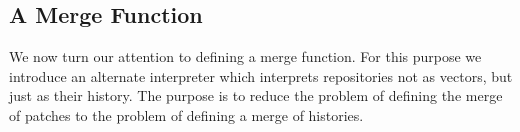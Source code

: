 \subsection{A Merge Function}

We now turn our attention to defining a merge function.
For this purpose we introduce an alternate interpreter which interprets repositories
not as vectors, but just as their history.
The purpose is to reduce the problem of defining the merge of patches to the problem
of defining a merge of histories.

\begin{code}%
\>[0]\AgdaSpace{}%
\AgdaSymbol{:}\AgdaSpace{}%
\AgdaSpace{}%
\AgdaSpace{}%
\<%
\\
\>[0]\AgdaSpace{}%
\AgdaSymbol{(}\AgdaSpace{}%
\AgdaSymbol{)}\AgdaSpace{}%
\AgdaSymbol{=}\AgdaSpace{}%
\AgdaSpace{}%
\<%
\\
\>[0]\AgdaSpace{}%
\AgdaSymbol{(}\AgdaSpace{}%
\AgdaSpace{}%
\AgdaSpace{}%
\AgdaSpace{}%
\AgdaSymbol{)}\AgdaSpace{}%
\AgdaSymbol{=}\AgdaSpace{}%
\AgdaSpace{}%
\AgdaSymbol{(}\AgdaSpace{}%
\AgdaSymbol{\{}\AgdaSpace{}%
\AgdaSymbol{=}\AgdaSpace{}%
\AgdaSymbol{\}}\AgdaSpace{}%
\AgdaSymbol{(}\AgdaSpace{}%
\AgdaSymbol{(}\AgdaSpace{}%
\AgdaSpace{}%
\AgdaSpace{}%
\AgdaSpace{}%
\AgdaOperator{\AgdaInductiveConstructor{::\AgdaUnderscore{}}}\AgdaSymbol{)))}\AgdaSpace{}%
\<%
\\
\>[0]\AgdaSpace{}%
\AgdaSymbol{(}\AgdaSpace{}%
\AgdaSpace{}%
\AgdaSpace{}%
\AgdaSymbol{)}\AgdaSpace{}%
\AgdaSymbol{=}\AgdaSpace{}%
\AgdaSpace{}%
\AgdaSymbol{(}\AgdaSpace{}%
\AgdaSymbol{\{}\AgdaSpace{}%
\AgdaSymbol{=}\AgdaSpace{}%
\AgdaSymbol{\}}\AgdaSpace{}%
\AgdaSymbol{(}\AgdaSpace{}%
\AgdaSymbol{(}\AgdaSpace{}%
\AgdaSpace{}%
\AgdaOperator{\AgdaInductiveConstructor{::\AgdaUnderscore{}}}\AgdaSymbol{)))}\AgdaSpace{}%

\end{code}
